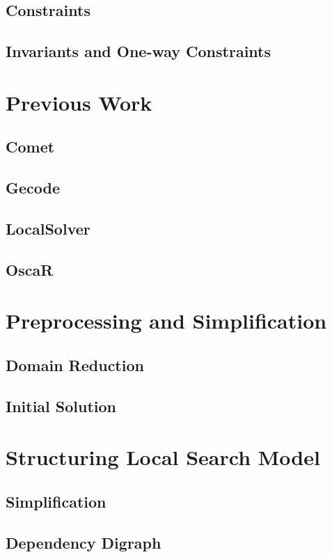 \documentclass[a4paper,12pt]{article}
\begin{document}
  \subsection{Constraints}
  
    \subsection{Invariants and One-way Constraints}
  
  

\section{Previous Work}
  \subsection{Comet}

  \subsection{Gecode}
  \subsection{LocalSolver}
  \subsection{OscaR}
  
\section{Preprocessing and Simplification}
  \subsection{Domain Reduction}
  \subsection{Initial Solution}
\section{Structuring Local Search Model}

  \subsection{Simplification}
    
  \subsection{Dependency Digraph}
  
\end{document}
